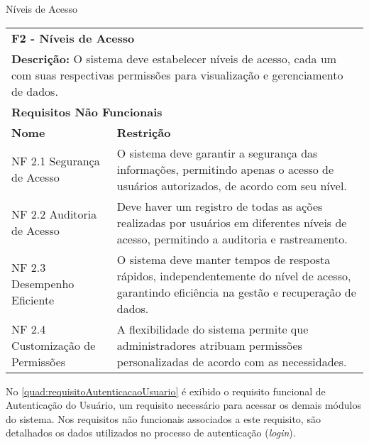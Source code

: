 \begin{tabframed}[htb]
  \caption{Níveis de Acesso}
  \label{quad:requisitoNiveisAcesso}
  \renewcommand{\arraystretch}{1.5}
  \begin{tabular}{|l|l|}
    \cline{1-2}
    \multicolumn{2}{|l|}{\textbf{F2 - Níveis de Acesso}}
    \\ \cline{1-2}

    \multicolumn{2}{|p{15cm}|}{
    \raggedright \textbf{Descrição:} O sistema deve estabelecer níveis de acesso, cada um com suas respectivas permissões para visualização e gerenciamento de dados.
    }
    \\ \cline{1-2}

    \multicolumn{2}{|l|}{\textbf{Requisitos Não Funcionais}}
    \\ \cline{1-2}

    \textbf{Nome}                     &
    \textbf{Restrição}
    \\ \cline{1-2}

    NF 2.1 Segurança de Acesso        &
    \multicolumn{1}{|p{8cm}|}{\raggedright O sistema deve garantir a segurança das informações, permitindo apenas o acesso de usuários autorizados, de acordo com seu nível.}
    \\ \cline{1-2}

    NF 2.2 Auditoria de Acesso        &
    \multicolumn{1}{|p{8cm}|}{\raggedright Deve haver um registro de todas as ações realizadas por usuários em diferentes níveis de acesso, permitindo a auditoria e rastreamento.}
    \\ \cline{1-2}

    NF 2.3 Desempenho Eficiente       &
    \multicolumn{1}{|p{8cm}|}{\raggedright O sistema deve manter tempos de resposta rápidos, independentemente do nível de acesso, garantindo eficiência na gestão e recuperação de dados.}
    \\ \cline{1-2}

    NF 2.4 Customização de Permissões &
    \multicolumn{1}{|p{8cm}|}{\raggedright A flexibilidade do sistema permite que administradores atribuam permissões personalizadas de acordo com as necessidades.}
    \\ \cline{1-2}
  \end{tabular}
  \fonte{} %
\end{tabframed}

No \autoref{quad:requisitoAutenticacaoUsuario} é exibido o requisito funcional de Autenticação do Usuário, um requisito necessário para acessar os demais módulos do sistema. Nos requisitos não funcionais associados a este requisito, são detalhados os dados utilizados no processo de autenticação (\textit{login}).

